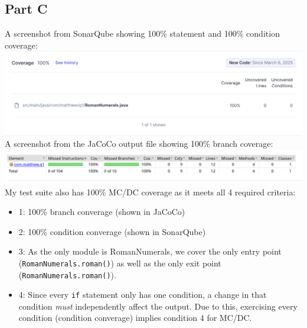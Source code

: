 \documentclass{article}
\begin{document}
\subsection{Part C}
A screenshot from SonarQube showing 100\% statement and 100\% condition coverage:\\
\includegraphics[scale=0.3]{sonarq.png}\\
A screenshot from the JaCoCo output file showing 100\% branch coverage:\\
\includegraphics[scale=0.3]{jacoco.png}\\
My test suite also has 100\% MC/DC coverage as it meets all 4 required criteria:
\begin{itemize}
	\item 1: 100\% branch converage (shown in JaCoCo)
	\item 2: 100\% condition converage (shown in SonarQube)
	\item 3: As the only module is RomanNumerals, we cover the only entry point (\lstinline{RomanNumerals.roman()}) as well as the only exit point
		(\lstinline{RomanNumerals.roman()}).
	\item 4: Since every \lstinline{if} statement only has one condition, a change in that condition \textit{must} independently affect the output.
		Due to this, exercising every condition (condition converage) implies condition 4 for MC/DC.
\end{itemize}
\end{document}
